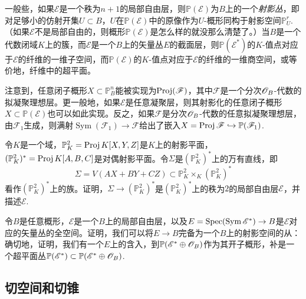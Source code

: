 一般些，如果$\mathscr E$是一个秩为$n+1$的局部自由层，则$\mathbb P(\mathscr E)$为$B$上的一个\textit{射影丛}，即对足够小的仿射开集$U\subset B$，$U$在$\mathbb P(\mathscr E)$中的原像作为$U$-概形同构于射影空间$\mathbb P_U^r$. （如果$\mathscr E$不是局部自由的，则概形$\mathbb P(\mathscr E)$是怎么样的就没那么清楚了。）当$B$是一个代数闭域$K$上的簇，而$\mathscr E$是一个$B$上的矢量丛$E$的截面层，则$\mathbb P(\mathscr E^*)$的$K$-值点对应于$\mathscr E$的纤维的一维子空间，而$\mathbb P(\mathscr E)$的$K$-值点对应于$\mathscr E$的纤维的一维商空间，或等价地，纤维中的超平面。

注意到，任意闭子概形$X\subset \mathbb P_B^n$能被实现为$\operatorname{Proj}(\mathscr F)$，其中$\mathscr F$是一个分次$\mathscr{O}_B$-代数的拟凝聚理想层。更一般地，如果$\mathscr E$是任意凝聚层，则其射影化的任意闭子概形$X\subset \mathbb P(\mathscr E)$也可以如此实现。反之，如果$\mathscr F$是分次$\mathscr{O}_B$-代数的任意拟凝聚理想层，由$\mathscr F_1$生成，则满射$\operatorname{Sym}(\mathscr F_1)\to \mathscr F$给出了嵌入$X=\operatorname{Proj} \mathscr F\hookrightarrow \mathbb P(\mathscr F_1)$.

\begin{exe}\label{exe:3.25}
	令$K$是一个域，$\mathbb P_K^2=\operatorname{Proj} K[X,Y,Z]$是$K$上的射影平面，$(\mathbb P_K^2)^*=\operatorname{Proj} K[A,B,C]$是对偶射影平面。令$\Sigma$是$(\mathbb P_K^2)^*$上的万有直线，即
	\[
		\Sigma=V(AX+BY+CZ)\subset \mathbb P_K^2\times_K (\mathbb P_K^2)^*
	\]
	看作$(\mathbb P_K^2)^*$上的族。证明，$\Sigma\to (\mathbb P_K^2)^*$是$(\mathbb P_K^2)^*$上的秩为$2$的局部自由层$\mathscr E$，并描述$\mathscr E$.
\end{exe}

\begin{exe}\label{exe:3.26}
	令$B$是任意概形，$\mathscr E$是一个$B$上的局部自由层，以及$E=\operatorname{Spec} (\operatorname{Sym}\mathscr E^*)\to B$是$\mathscr E$对应的矢量丛的全空间。证明，我们可以将$E\to B$完备为一个$B$上的射影空间的从：确切地，证明，我们有一个$E$上的含入，到$\mathbb P(\mathscr E^*\oplus \mathscr{O}_B)$作为其开子概形，补是一个超平面丛$\mathbb P(\mathscr E^*)\subset \mathbb P(\mathscr E^*\oplus \mathscr{O}_B)$.
\end{exe}


\subsection{切空间和切锥} \label{s:3.2.4}
